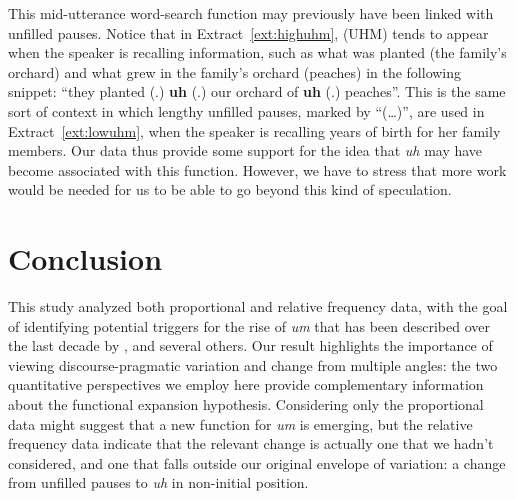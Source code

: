 \documentclass[11pt]{article}
\begin{document}
This mid-utterance word-search function may previously have been linked with
unfilled pauses.
Notice that in Extract~\ref{ext:highuhm}, (UHM) tends to appear when the speaker
is recalling information, such as what was planted (the family's orchard) and
what grew in the family's orchard (peaches) in the following snippet:
``they planted (.) \textbf{uh} (.) our orchard of \textbf{uh} (.) peaches''.
This is the same sort of context in which lengthy unfilled pauses, marked by
``(\ldots)'', are used in Extract~\ref{ext:lowuhm}, when the speaker is
recalling years of birth for her family members.
Our data thus provide some support for the idea that \emph{uh} may have become
associated with this function.
However, we have to stress that more work would be needed for us to be able to
go beyond this kind of speculation.

\section{Conclusion}

This study analyzed both proportional and relative frequency data, with the goal
of identifying potential triggers for the rise of \emph{um} that has been
described over the last decade by \textcite{fruehwald2016},
\textcite{tottie2016} and several others.
Our result highlights the importance of viewing discourse-pragmatic variation
and change from multiple angles:
the two quantitative perspectives we employ here provide complementary
information about the functional expansion hypothesis.
Considering only the proportional data might suggest that a new function for
\emph{um} is emerging, but the relative frequency data indicate that the
relevant change is actually one that we hadn't considered, and one that falls
outside our original envelope of variation: a change from unfilled pauses to
\emph{uh} in non-initial position.


\printbibliography
\end{document}
